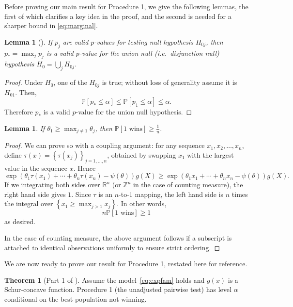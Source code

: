\documentclass[aos, authoryear]{imsart}
\newtheorem{lemma}[corollary]{Lemma}
\theoremstyle{definition}
\theoremstyle{custom}
\newtheorem*{customthm}{Theorem}
\newcommand{\PP}{\mathbb{P}}
\begin{document}
Before proving our main result for Procedure 1, we give the following lemmas, the first of which clarifies a key idea in the proof, and the second is needed for a sharper bound in \eqref{eq:marginal}.

\begin{lemma}[\citealp{Berger:1982hy}]
\label{lma:union}
If $p_j$ are valid $p$-values for testing null hypothesis $H_{0j}$, then $p_* = \max_j p_j$ is a valid $p$-value for the union null (i.e.\ disjunction null) hypothesis $H_0 = \bigcup_j H_{0j}$.
\end{lemma}

\begin{proof}
Under $H_0$, one of the $H_{0j}$ is true; without loss of generality assume it is $H_{01}$. Then,
\[\PP\left[p_* \le \alpha\right] \le \PP\left[p_1 \le \alpha\right] \le \alpha.\]
Therefore $p_*$ is a valid $p$-value for the union null hypothesis.
\end{proof}

\begin{lemma}
\label{lma:margsharp}
If $\theta_1 \ge \max_{j \ne 1} \theta_j$, then $\PP\left[1 \text{ wins}\right] \ge \frac{1}{n}$.
\end{lemma}

\begin{proof}
We can prove so with a coupling argument: for any sequence $x_1, x_2, \ldots, x_n$, define $\tau\left(x\right) = \left\{\tau\left(x_j\right)\right\}_{j = 1, \ldots, n}$, obtained by swapping $x_1$ with the largest value in the sequence $x$. Hence
\[\exp\left(\theta_1 \tau\left(x_1\right) + \cdots + \theta_n \tau\left(x_n\right) - \psi\left(\theta\right)\right) g\left(X\right) \ge \exp\left(\theta_1 x_1 + \cdots + \theta_n x_n - \psi\left(\theta\right)\right) g\left(X\right).\]
If we integrating both sides over $\mathbb{R}^n$ (or $\mathbb{Z}^n$ in the case of counting measure), the right hand side gives $1$. Since $\tau$ is an $n$-to-$1$ mapping, the left hand side is $n$ times the integral over $\left\{x_1 \ge \max_{j > 1} x_j\right\}$. In other words,
\[n \PP\left[1 \text{ wins}\right] \ge 1\]
as desired.

In the case of counting measure, the above argument follows if a subscript is attached to identical observations uniformly to ensure strict ordering.
\end{proof}

We are now ready to prove our result for Procedure 1, restated here for reference.

\begin{customthm}[Part 1 of ]
Assume the model~\eqref{eq:expfam} holds and $g\left(x\right)$ is a Schur-concave function. Procedure 1 (the unadjusted pairwise test) has level $\alpha$ conditional on the best population not winning.
\end{customthm}
\end{document}

